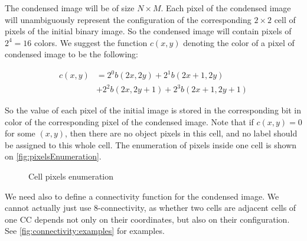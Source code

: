 \documentclass[hidelinks]{llncs}
\newcommand{\texten}[1]{#1}
\newcommand{\textru}[1]{}
\begin{document}
\texten{
The condensed image will be of size $N \times M$. Each pixel of the condensed
image will unambiguously represent the configuration of the corresponding
$2\times 2$ cell of pixels of the initial binary image. So the condensed image
will contain pixels of $2^4 = 16$ colors. We suggest the function $c(x, y)$
denoting the color of a pixel of condensed image to be the following:
}\textru{
Сжатое изображение будет иметь размер $N \times M$. Каждый пиксель полученного
изображения должен будет однозначно задавать конфигурацию соответствующих
четырёх пикселей исходного изображения, поэтому он может быть одного из $2^4 =
16$ цветов. Предлагается такая функция $c(x,y)$, кодирующая четыре исходных
пикселя в цвет клетки:
}
\begin{align*}
  c(x, y) &= 2^0 b(2x, 2y)   + 2^1 b(2x+1, 2y) \\
          &+ {} 2^2 b(2x, 2y+1) + 2^3 b(2x+1,2y+1)
\end{align*}

\texten{
So the value of each pixel of the initial image is stored in the corresponding
bit in color of the corresponding pixel of the condensed image. Note that if
$c(x, y) = 0$ for some $(x, y)$, then there are no object pixels in this cell,
and no label should be assigned to this whole cell. The enumeration of pixels
inside one cell is shown on \autoref{fig:pixelsEnumeration}.
}\textru{
Таким образом значение каждого из исходных пикселей просто записано в
соответствующий бит в итоговом пикселе. Важно отметить, что если все четыре
исходных пикселя были фоновые, то и клетка будет иметь цвет 0. Нумерация
пикселей внутри клетки показана на \autoref{fig:pixelsEnumeration}.
}

\begin{figure}
  \centering
  \caption{Cell pixels enumeration}
  \label{fig:pixelsEnumeration}
\end{figure}

\texten{
We need also to define a connectivity function for the condensed image.
We cannot actually just use 8-connectivity, as whether two cells are adjacent
cells of one CC depends not only on their coordinates, but also on their
configuration. See \autoref{fig:connectivity:examples} for examples.
}\textru{
Ещё нужно дать определение связности для сжатого изображения. Мы уже не можем
использовать 8-связность: теперь нельзя сказать, связаны ли две клетки, не
проанализировав их цвета. Смотри \autoref{fig:connectivity:examples}.
}
\end{document}
